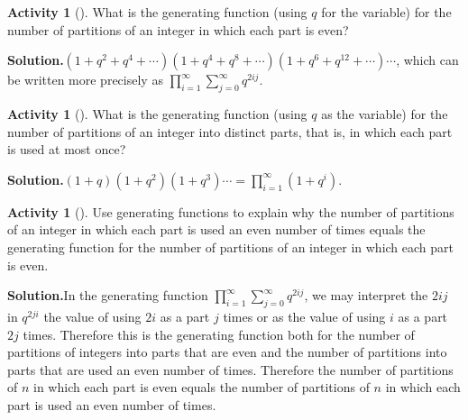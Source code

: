 \documentclass[10pt,]{book}
\theoremstyle{plain}
\theoremstyle{definition}
\newtheorem{activity}[project]{Activity}
\numberwithin{equation}{chapter}
\begin{document}
\begin{activity}[]\label{activity-193}
What is the generating function (using \(q\) for the variable) for the number of partitions of an integer in which each part is even?%
\par\medskip\noindent%
\textbf{Solution.}\quad \((1+q^2+q^4+\cdots)(1+q^4+q^8+\cdots)(1+q^6+q^{12}+\cdots)\cdots\), which can be written more precisely as \(\displaystyle\prod_{i=1}^\infty
\sum_{j=0}^\infty q^{2ij}\).%
\end{activity}
\begin{activity}[]\label{activity-194}
What is the generating function (using \(q\) as the variable) for the number of partitions of an integer into distinct parts, that is, in which each part is used at most once?%
\par\medskip\noindent%
\textbf{Solution.}\quad \(\displaystyle (1+q)(1+q^2)(1+q^3)\cdots=
\prod_{i=1}^\infty(1+q^i)\).%
\end{activity}
\begin{activity}[]\label{activity-195}
Use generating functions to explain why the number of partitions of an integer in which each part is used an even number of times equals the generating function for the number of partitions of an integer in which each part is even.%
\par\medskip\noindent%
\textbf{Solution.}\quad In the generating function \(\displaystyle\prod_{i=1}^\infty \sum_{j=0}^\infty q^{2ij}\), we may interpret the \(2ij\) in \(q^{2ji}\) the value of using \(2i\) as a part \(j\) times or as the value of using \(i\) as a part \(2j\) times. Therefore this is the generating function both for the number of partitions of integers into parts that are even and the number of partitions into parts that are used an even number of times. Therefore the number of partitions of \(n\) in which each part is even equals the number of partitions of \(n\) in which each part is used an even number of times.%
\end{activity}
\end{document}
